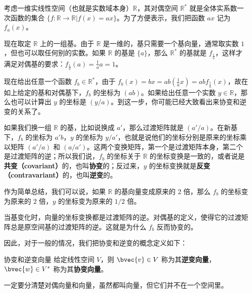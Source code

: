 \begin{example}{}
考虑一维实线性空间（也就是实数域本身）$\mathbb{R}$，其对偶空间 $\mathbb{R}^*$ 就是全体实系数一次函数的集合 $\{f:\mathbb{R}\rightarrow\mathbb{R}|f(x)=ax\}$。为了方便表示，我们把函数 $ax$ 记为 $f_a(x)$。

现在取定 $\mathbb{R}$ 上的一组基。由于 $\mathbb{R}$ 是一维的，基只需要一个基向量，通常取实数 $1$，但也可以取任何别的实数。如果 $\mathbb{R}$ 的基是 $\{a\}$，那么 $\mathbb{R}^*$ 的基就是 $f_{\frac{1}{a}}$，这样才满足对偶基的要求：$f_{\frac{1}{a}}(a)=\frac{1}{a}a=1$。

现在给出任意一个函数 $f_b\in\mathbb{R}^*$，由于 $f_b(x)=bx=ab(\frac{1}{a}x)=abf_{\frac{1}{a}}(x)$，故在如上给定的基和对偶基下，$f_b$ 的坐标为 $(ab)$。如果给出任意一个实数 $y\in\mathbb{R}$，那么也可以计算出 $y$ 的坐标是 $(y/a)$。到这一步，你可能已经大致看出来协变和逆变的关系了。

如果我们换一组 $\mathbb{R}$ 的基，比如说换成 $a'$，那么过渡矩阵就是 $(a'/a)$。在新基下，$f_b$ 的坐标为 $a'b$，$y$ 的坐标为 $y/a'$，也就是说他们的坐标分别是原来的坐标乘以矩阵 $(a'/a)$ 和 $(a/a')$。这两个变换矩阵，第一个是过渡矩阵本身，第二个是过渡矩阵的逆；所以我们说，$f_b$ 的坐标关于 $\mathbb{R}$ 的坐标变换是一致的，或者说是\textbf{共变（covariant）}的，也叫\textbf{协变}的；反过来，$y$ 的坐标变换就是\textbf{反变（contravariant）}的，也叫\textbf{逆变}的。

作为简单总结，我们可以说，如果 $\mathbb{R}$ 的基向量变成原来的 $2$ 倍，那么 $f_b$ 的坐标变为原来的 $2$ 倍，$y$ 的坐标变为原来的 $1/2$ 倍。
\end{example}

当基变化时，向量的坐标变换都是过渡矩阵的逆。对偶基的定义，使得它的过渡矩阵总是原空间基的过渡矩阵的逆。这就是为什么 $f_b$ 反而协变的。

因此，对于一般的情况，我们把协变和逆变的概念定义如下：

\begin{definition}{协变和逆变向量}
给定线性空间 $V$，则 $\bvec{v}\in V$ 称为其\textbf{逆变向量}，$\bvec{w}\in V^*$ 称为其\textbf{协变向量}。
\end{definition}

一定要分清楚对偶向量和向量，虽然都叫向量，但它们并不在一个空间里。


